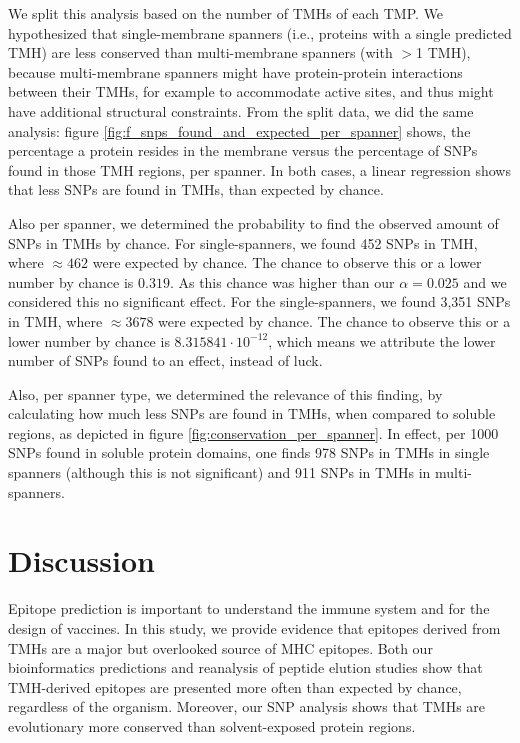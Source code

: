 We split this analysis based on the number of TMHs
of each TMP. 
We hypothesized that single-membrane spanners (i.e., proteins
with a single predicted TMH) are less conserved than multi-membrane spanners (with $>$1 TMH),
because multi-membrane spanners
might have protein-protein interactions between their TMHs, 
for example to accommodate active sites, and 
thus might have additional structural constraints.
From the split data, we did the same analysis:
figure \ref{fig:f_snps_found_and_expected_per_spanner} 
shows, the percentage a protein resides in the membrane versus the
percentage of SNPs found in those TMH regions, per spanner.
In both cases, a linear regression shows that less
SNPs are found in TMHs, than expected by chance.

Also per spanner, we determined the probability to find the 
observed amount of SNPs in TMHs by chance.
For single-spanners, we found 452 SNPs in TMH, where
$\approx462$ were expected by chance. 
The chance to observe this or a lower number by chance is 
$0.319$. As this chance was higher than our $\alpha = 0.025$
and we considered this no significant effect.
For the single-spanners, we found 3,351 SNPs in TMH, where
$\approx3678$ were expected by chance. 
The chance to observe this or a lower number by chance is 
$8.315841 \cdot 10^{-12}$, 
which means we attribute the lower number of SNPs found
to an effect, instead of luck. 

Also, per spanner type, 
we determined the relevance of this finding, by
calculating how much less SNPs are found in TMHs,
when compared to soluble regions,
as depicted in figure \ref{fig:conservation_per_spanner}.
In effect, per 1000 SNPs found in soluble protein domains, 
one finds 978 SNPs in TMHs 
in single spanners (although this is not significant)
and 911 SNPs in TMHs in multi-spanners.

\section{Discussion}


Epitope prediction is 
important to understand the immune system and for the design of vaccines. In this study, we provide evidence that epitopes
derived from TMHs are a major but overlooked source of MHC epitopes. Both our bioinformatics predictions and reanalysis of peptide elution studies show that TMH-derived epitopes are 
presented more often than expected by chance, regardless of the organism. Moreover, our SNP analysis shows  
that TMHs are evolutionary more conserved than solvent-exposed protein regions.

